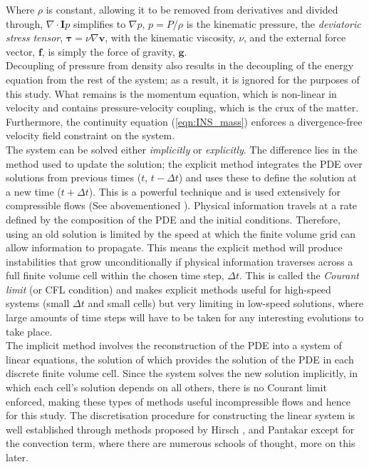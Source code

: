 \documentclass[final,3p,times,twocolumn]{elsarticle}
\begin{document}
Where $\rho$ is constant, allowing it to be removed from derivatives and divided through, $\nabla \cdot \mathbf{I} p$ simplifies to $ \nabla p$, $p=P/\rho$ is the kinematic pressure, the \textit{deviatoric stress tensor}, $\mathbf{\tau}=\nu \nabla \mathbf{v}$, with the kinematic viscosity, $\nu$, and the external force vector, $\textbf{f}$, is simply the force of gravity, $\mathbf{g}$. \\ 
Decoupling of pressure from density also results in the decoupling of the energy equation from the rest of the system; as a result, it is ignored for the purposes of this study. What remains is the momentum equation, which is non-linear in velocity and contains pressure-velocity coupling, which is the crux of the matter. Furthermore, the continuity equation (\ref{eqn:INS_mass}) enforces a divergence-free velocity field constraint on the system. \\ The system can be solved either \textit{implicitly} or \textit{explicitly}. The difference lies in the method used to update the solution; the explicit method integrates the PDE over solutions from previous times ($t$, $t - \Delta t$) and uses these to define the solution at a new time ($t+\Delta t$). This is a powerful technique and is used extensively for compressible flows (See abovementioned \cite{Crank1947AType} \cite{Lax1954WeakComputation} \cite{Lax1957HyperbolicII} \cite{Lax1960SystemsLaws} \cite{Godunov1959FiniteDynamics}). Physical information travels at a rate defined by the composition of the PDE and the initial conditions. Therefore, using an old solution is limited by the speed at which the finite volume grid can allow information to propagate. This means the explicit method will produce instabilities that grow unconditionally if physical information traverses across a full finite volume cell within the chosen time step, $\Delta t$. This is called the \textit{Courant limit} (or CFL condition) and makes explicit methods useful for high-speed systems (small $\Delta t$ and small cells) but very limiting in low-speed solutions, where large amounts of time steps will have to be taken for any interesting evolutions to take place. \\ The implicit method involves the reconstruction of the PDE into a system of linear equations, the solution of which provides the solution of the PDE in each discrete finite volume cell. Since the system solves the new solution implicitly, in which each cell's solution depends on all others, there is no Courant limit enforced, making these types of methods useful incompressible flows and hence for this study. The discretisation procedure for constructing the linear system is well established through methods proposed by Hirsch \cite{Hirsch1991NumericalDiscretization}, and Pantakar \cite{Patankar1972AFLOWS} except for the convection term, where there are numerous schools of thought, more on this later.
\end{document}
